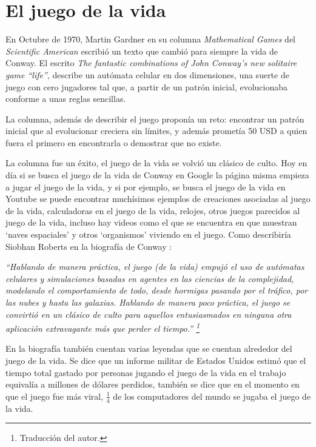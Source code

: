 \section{El juego de la vida}

En Octubre de 1970, Martin Gardner en su columna \textit{Mathematical Games} del \textit{Scientific American} \cite{Gardner1970} escribi\'o un texto que cambi\'o para siempre la vida de Conway. El escrito \textit{The fantastic combinations of John Conway's new solitaire game ``life''}, describe un autómata celular en dos dimensiones, una suerte de juego con cero jugadores tal que, a partir de un patr\'on inicial, evolucionaba conforme a unas reglas sencillas.

La columna, adem\'as de describir el juego propon\'ia un reto: encontrar un patr\'on inicial que al evolucionar creciera sin l\'imites, y adem\'as promet\'ia 50 USD a quien fuera el primero en encontrarla o demostrar que no existe.

La columna fue un \'exito, el juego de la vida se volvi\'o un cl\'asico de culto. Hoy en d\'ia si se busca el juego de la vida de Conway en Google la p\'agina misma empieza a jugar el juego de la vida, y si por ejemplo, se busca el juego de la vida en Youtube se puede encontrar much\'isimos ejemplos de creaciones asociadas al juego de la vida, calculadoras en el juego de la vida, relojes, otros juegos parecidos al juego de la vida, incluso hay videos como el que se encuentra en \cite{YTEpicLife} que muestran `naves espaciales' y otros `organismos' viviendo en el juego. Como describir\'ia Siobhan Roberts en la biograf\'ia de Conway \cite{Roberts2015-ur}:

\textit{``Hablando de manera pr\'actica, el juego (de la vida) empuj\'o el uso de autómatas celulares y simulaciones basadas en agentes en las ciencias de la complejidad, modelando el comportamiento de todo, desde hormigas pasando por el tr\'afico, por las nubes y hasta las galaxias. Hablando de manera poco pr\'actica, el juego se convirti\'o en un cl\'asico de culto para aquellos entusiasmados en ninguna otra aplicaci\'on extravagante m\'as que perder el tiempo.'' \footnote{Traducci\'on del autor.}}

En la biograf\'ia tambi\'en cuentan varias leyendas que se cuentan alrededor del juego de la vida. Se dice que un informe militar de Estados Unidos estim\'o que el tiempo total gastado por personas jugando el juego de la vida en el trabajo equival\'ia a millones de dólares perdidos, tambi\'en se dice que en el momento en que el juego fue m\'as viral, $\frac{1}{4}$ de los computadores del mundo se jugaba el juego de la vida.

